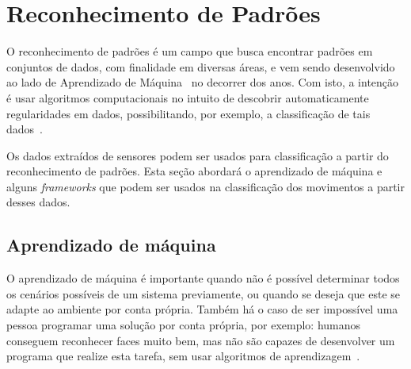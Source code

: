 

\section{Reconhecimento de Padrões}\label{sec:patternrec}

O reconhecimento de padrões é um campo que busca encontrar padrões em conjuntos de dados, com finalidade em diversas áreas, e vem sendo desenvolvido ao lado de Aprendizado de Máquina~\cite{samuel:1959machine_learning} no decorrer dos anos. Com isto, a intenção é usar algoritmos computacionais no intuito de descobrir automaticamente regularidades em dados, possibilitando, por exemplo, a classificação de tais dados~\cite{bishop:2006}.

Os dados extraídos de sensores podem ser usados para classificação a partir do reconhecimento de padrões. Esta seção abordará o aprendizado de máquina e alguns \textit{frameworks} que podem ser usados na classificação dos movimentos a partir desses dados.

\subsection{Aprendizado de máquina}\label{sec:ml}

O aprendizado de máquina é importante quando não é possível determinar todos os cenários possíveis de um sistema previamente, ou quando se deseja que este se adapte ao ambiente por conta própria. Também há o caso de ser impossível uma pessoa programar uma solução por conta própria, por exemplo: humanos conseguem reconhecer faces muito bem, mas não são capazes de desenvolver um programa que realize esta tarefa, sem usar algoritmos de aprendizagem~\cite{russell:2010}.

